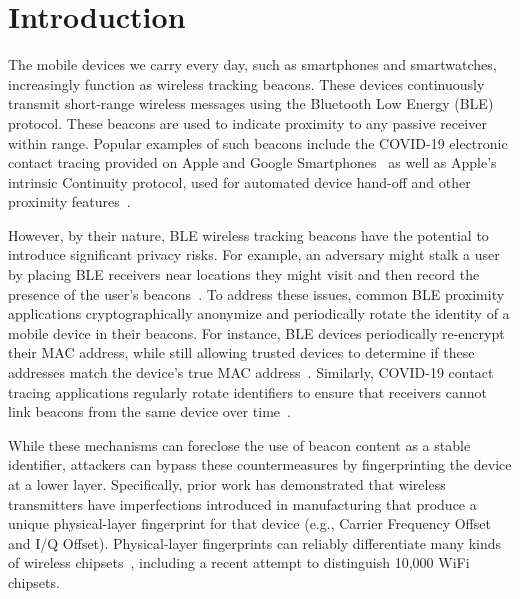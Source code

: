 \section{Introduction}

The mobile devices we carry every day, such as smartphones and
smartwatches, increasingly function as wireless tracking
beacons. These devices continuously transmit short-range wireless
messages using the Bluetooth Low Energy (BLE) protocol.  These beacons
are used to indicate proximity to any passive receiver within range.
Popular examples of such beacons include the COVID-19 electronic
contact tracing provided on Apple and Google
Smartphones~\cite{9-millionca} as well as Apple's intrinsic Continuity
protocol, used for automated device hand-off and other proximity
features~\cite{applecontinuity}.

However, by their nature, BLE wireless tracking beacons have the
potential to introduce significant privacy risks. For example, an
adversary might stalk a user by placing BLE receivers near locations
they might visit and then record the presence of the user's
beacons~\cite{exposurefaqmanual,dp3t}.  To address these issues, common BLE proximity
applications cryptographically anonymize and periodically rotate the
identity of a mobile device in their beacons. For instance, BLE
devices periodically re-encrypt their MAC address, while still
allowing trusted devices to determine if these addresses match the
device's true MAC address~\cite{bluetoothprivacy}. Similarly, COVID-19 contact tracing
applications regularly rotate identifiers to ensure that receivers
cannot link beacons from the same device over time~\cite{exposurenotificationmanual}.

While these mechanisms can foreclose the use of beacon content as a
stable identifier, attackers can bypass these countermeasures by
fingerprinting the device at a lower layer. Specifically, prior work
has demonstrated that wireless transmitters have imperfections
introduced in manufacturing that produce a unique physical-layer
fingerprint for that device (e.g., Carrier Frequency Offset and I/Q
Offset). Physical-layer fingerprints can reliably differentiate many
kinds of wireless chipsets~\cite{rfidphysical_danev,Brik_radiometric,transientBT_Hall,suskitransient,tximperfections_polak,femtocell_kennedy,adsb,subgrfid}, including a recent attempt to
distinguish 10,000 WiFi~\cite{kaushik10000wifi} chipsets.

